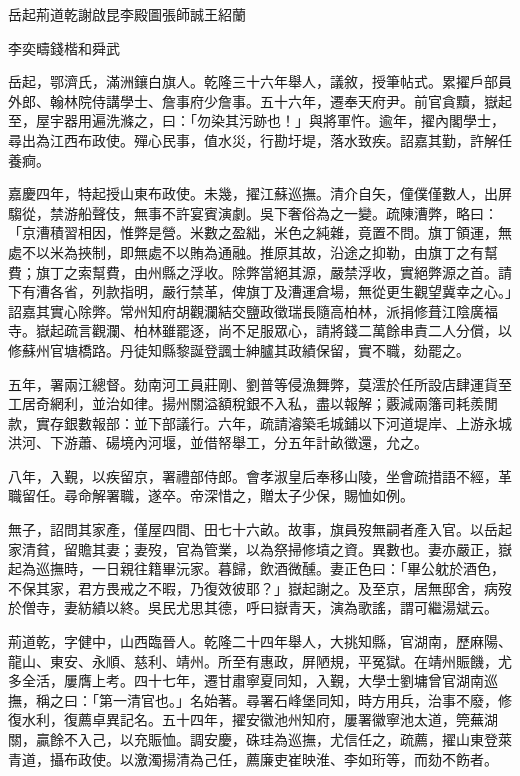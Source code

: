 
\begin{pinyinscope}
岳起荊道乾謝啟昆李殿圖張師誠王紹蘭

李奕疇錢楷和舜武

岳起，鄂濟氏，滿洲鑲白旗人。乾隆三十六年舉人，議敘，授筆帖式。累擢戶部員外郎、翰林院侍講學士、詹事府少詹事。五十六年，遷奉天府尹。前官貪黷，嶽起至，屋宇器用遍洗滌之，曰：「勿染其污跡也！」與將軍忤。逾年，擢內閣學士，尋出為江西布政使。殫心民事，值水災，行勘圩堤，落水致疾。詔嘉其勤，許解任養痾。

嘉慶四年，特起授山東布政使。未幾，擢江蘇巡撫。清介自矢，僮僕僅數人，出屏騶從，禁游船聲伎，無事不許宴賓演劇。吳下奢俗為之一變。疏陳漕弊，略曰：「京漕積習相因，惟弊是營。米數之盈絀，米色之純雜，竟置不問。旗丁領運，無處不以米為挾制，即無處不以賄為通融。推原其故，沿途之抑勒，由旗丁之有幫費；旗丁之索幫費，由州縣之浮收。除弊當絕其源，嚴禁浮收，實絕弊源之首。請下有漕各省，列款指明，嚴行禁革，俾旗丁及漕運倉場，無從更生觀望冀幸之心。」詔嘉其實心除弊。常州知府胡觀瀾結交鹽政徵瑞長隨高柏林，派捐修葺江陰廣福寺。嶽起疏言觀瀾、柏林雖罷逐，尚不足服眾心，請將錢二萬餘串責二人分償，以修蘇州官塘橋路。丹徒知縣黎誕登諷士紳臚其政績保留，實不職，劾罷之。

五年，署兩江總督。劾南河工員莊剛、劉普等侵漁舞弊，莫澐於任所設店肆運貨至工居奇網利，並治如律。揚州關溢額稅銀不入私，盡以報解；覈減兩籓司耗羨閒款，實存銀數報部：並下部議行。六年，疏請濬築毛城鋪以下河道堤岸、上游永城洪河、下游蕭、碭境內河堰，並借帑舉工，分五年計畝徵還，允之。

八年，入覲，以疾留京，署禮部侍郎。會孝淑皇后奉移山陵，坐會疏措語不經，革職留任。尋命解署職，遂卒。帝深惜之，贈太子少保，賜恤如例。

無子，詔問其家產，僅屋四間、田七十六畝。故事，旗員歿無嗣者產入官。以岳起家清貧，留贍其妻；妻歿，官為管業，以為祭掃修墳之資。異數也。妻亦嚴正，嶽起為巡撫時，一日親往籍畢沅家。暮歸，飲酒微醺。妻正色曰：「畢公躭於酒色，不保其家，君方畏戒之不暇，乃復效彼耶？」嶽起謝之。及至京，居無邸舍，病歿於僧寺，妻紡績以終。吳民尤思其德，呼曰嶽青天，演為歌謠，謂可繼湯斌云。

荊道乾，字健中，山西臨晉人。乾隆二十四年舉人，大挑知縣，官湖南，歷麻陽、龍山、東安、永順、慈利、靖州。所至有惠政，屏陋規，平冤獄。在靖州賑饑，尤多全活，屢膺上考。四十七年，遷甘肅寧夏同知，入覲，大學士劉墉曾官湖南巡撫，稱之曰：「第一清官也。」名始著。尋署石峰堡同知，時方用兵，治事不廢，修復水利，復薦卓異記名。五十四年，擢安徽池州知府，屢署徽寧池太道，筦蕪湖關，贏餘不入己，以充賑恤。調安慶，硃珪為巡撫，尤信任之，疏薦，擢山東登萊青道，攝布政使。以激濁揚清為己任，薦廉吏崔映淮、李如珩等，而劾不飭者。


\end{pinyinscope}
